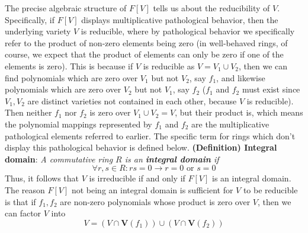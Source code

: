 \documentclass{article}
\newcommand*{\tb}{\textbf}
\newcommand*{\ti}{\textit}
\newcommand*{\nn}{\newline \newline}
\newcommand*{\V}{\ensuremath{\mathbf{V}}}
\begin{document}
The precise algebraic structure of $ F[V] $ tells us about the reducibility of $ V $. Specifically, if $ F[V] $ displays multiplicative pathological behavior, then the underlying variety $ V $ is reducible, where by pathological behavior we specifically refer to the product of non-zero elements being zero (in well-behaved rings, of course, we expect that the product of elements can only be zero if one of the elements is zero). This is because if $ V $ is reducible as $ V = V_1 \cup V_2 $, then we can find polynomials which are zero over $ V_1 $ but not $ V_2 $, say $ f_1 $, and likewise polynomials which are zero over $ V_2 $ but not $ V_1 $, say $ f_2 $ ($ f_1 $ and $ f_2 $ must exist since $ V_1, V_2 $ are distinct varieties not contained in each other, because $ V $ is reducible). Then neither $ f_1 $ nor $ f_2 $ is zero over $ V_1 \cup V_2 = V $, but their product is, which means the polynomial mappings represented by $ f_1 $ and $ f_2 $ are the multiplicative pathological elements referred to earlier. The specific term for rings which don't display this pathological behavior is defined below.
\nn
\tb{(Definition) Integral domain}: \ti{A commutative ring $ R $ is an \tb{integral domain} if}
$$ \forall r, s \in R: r s = 0 \rightarrow r = 0 \text{ or } s = 0 $$
Thus, it follows that $ V $ is irreducible if and only if $ F[V] $ is an integral domain. The reason $ F[V] $ not being an integral domain is sufficient for $ V $ to be reducible is that if $ f_1, f_2 $ are non-zero polynomials whose product is zero over $ V $, then we can factor $ V $ into
$$ V = (V \cap \V(f_1)) \cup (V \cap \V(f_2)) $$
\end{document}
